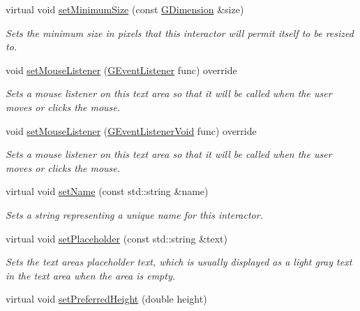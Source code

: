 \begin{DoxyCompactItemize}
virtual void \mbox{\hyperlink{classsgl_1_1GInteractor_a3b1046117ac6cb7abe467e00ba8a81f4}{set\+Minimum\+Size}} (const \mbox{\hyperlink{structsgl_1_1GDimension}{G\+Dimension}} \&size)
\begin{DoxyCompactList}\small\item\em Sets the minimum size in pixels that this interactor will permit itself to be resized to. \end{DoxyCompactList}\item 
void \mbox{\hyperlink{classsgl_1_1GTextArea_a2c6a3746da7ffa3819294896d4423059}{set\+Mouse\+Listener}} (\mbox{\hyperlink{namespacesgl_ae9f3e9eab70035da1a2b114e21357b25}{G\+Event\+Listener}} func) override
\begin{DoxyCompactList}\small\item\em Sets a mouse listener on this text area so that it will be called when the user moves or clicks the mouse. \end{DoxyCompactList}\item 
void \mbox{\hyperlink{classsgl_1_1GTextArea_a3ed42c5f929cba378927916dd73e6576}{set\+Mouse\+Listener}} (\mbox{\hyperlink{namespacesgl_a54427ce97bb1c2804e4fe2b0a62e8b17}{G\+Event\+Listener\+Void}} func) override
\begin{DoxyCompactList}\small\item\em Sets a mouse listener on this text area so that it will be called when the user moves or clicks the mouse. \end{DoxyCompactList}\item 
virtual void \mbox{\hyperlink{classsgl_1_1GInteractor_a9d3a2685df23b5e7cbf59c19c4a1f9b5}{set\+Name}} (const std\+::string \&name)
\begin{DoxyCompactList}\small\item\em Sets a string representing a unique name for this interactor. \end{DoxyCompactList}\item 
virtual void \mbox{\hyperlink{classsgl_1_1GTextArea_aa21a9bebb4652ab6780d0c11eff47aee}{set\+Placeholder}} (const std\+::string \&text)
\begin{DoxyCompactList}\small\item\em Sets the text area\textquotesingle{}s placeholder text, which is usually displayed as a light gray text in the text area when the area is empty. \end{DoxyCompactList}\item 
virtual void \mbox{\hyperlink{classsgl_1_1GInteractor_a1ab987704fce32098706c6f00fb08218}{set\+Preferred\+Height}} (double height)

\end{DoxyCompactItemize}
